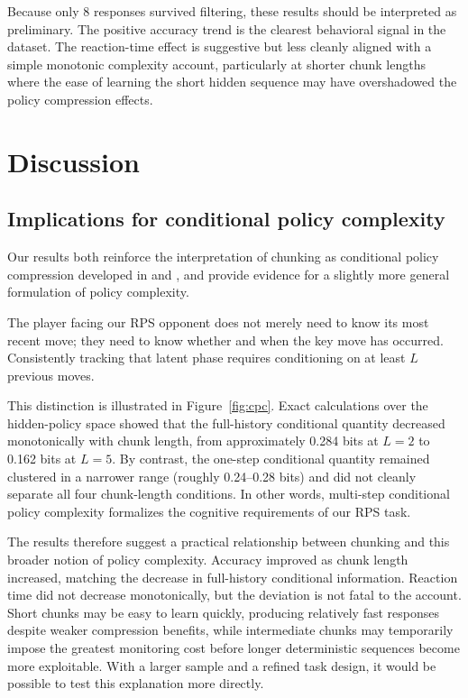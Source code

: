 \documentclass[11pt]{article}
\begin{document}
Because only 8 responses survived filtering, these results should be interpreted as preliminary. The positive accuracy trend is the clearest behavioral signal in the dataset. The reaction-time effect is suggestive but less cleanly aligned with a simple monotonic complexity account, particularly at shorter chunk lengths where the ease of learning the short hidden sequence may have overshadowed the policy compression effects.

\section{Discussion}

\label{sec:discussion}

\subsection{Implications for conditional policy complexity}

Our results both reinforce the interpretation of chunking as conditional policy compression developed in \citet{gershman2021reward} and \citet{lai2025action}, and provide evidence for a slightly more general formulation of policy complexity.

The player facing our RPS opponent does not merely need to know its most recent move; they need to know whether and when the key move has occurred. Consistently tracking that latent phase requires conditioning on at least $L$ previous moves.

This distinction is illustrated in Figure~\ref{fig:cpc}. Exact calculations over the hidden-policy space showed that the full-history conditional quantity decreased monotonically with chunk length, from approximately 0.284 bits at $L=2$ to 0.162 bits at $L=5$. By contrast, the one-step conditional quantity remained clustered in a narrower range (roughly 0.24--0.28 bits) and did not cleanly separate all four chunk-length conditions. In other words, multi-step conditional policy complexity formalizes the cognitive requirements of our RPS task.

The results therefore suggest a practical relationship between chunking and this broader notion of policy complexity. Accuracy improved as chunk length increased, matching the decrease in full-history conditional information. Reaction time did not decrease monotonically, but the deviation is not fatal to the account. Short chunks may be easy to learn quickly, producing relatively fast responses despite weaker compression benefits, while intermediate chunks may temporarily impose the greatest monitoring cost before longer deterministic sequences become more exploitable. With a larger sample and a refined task design, it would be possible to test this explanation more directly.
\end{document}
